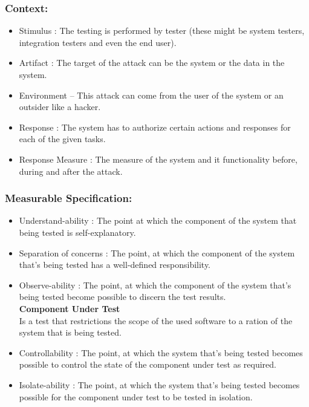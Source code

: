 \documentclass[11pt]{article}
\begin{document}
		\subsubsection{Context:}
		\begin{itemize}
			\item Stimulus : The testing is performed by tester (these might be system testers, integration testers and even the end user).
			\item Artifact : The target of the attack can be the system or the data in the system.
			\item Environment – This attack can come from the user of the system or an outsider like a hacker. 
			\item Response : The system has to authorize certain actions and responses for each of the given tasks.
			\item Response Measure : The measure of the system and it functionality before, during and after the attack.
		\end{itemize}
		
		
		\subsubsection{Measurable Specification:}
		\begin{itemize}
			\item Understand-ability : The point at which the component of the system that being tested is self-explanatory.
			\item Separation of concerns : The point, at which the component of the system that's being tested has a well-defined responsibility.
			\item Observe-ability : The point, at which the component of the system that’s being tested become possible to discern the test results. \\
						
			\textbf{Component Under Test}\\
			Is a test that restrictions the scope of the used software to a ration of the system that is being tested.
			
			\item Controllability : The point, at which the system that’s being tested becomes possible to control the state of the component under test as required.
			\item Isolate-ability : The point, at which the system that’s being tested becomes possible for the component under test to be tested in isolation.
			
		\end{itemize}
		
\end{document}

